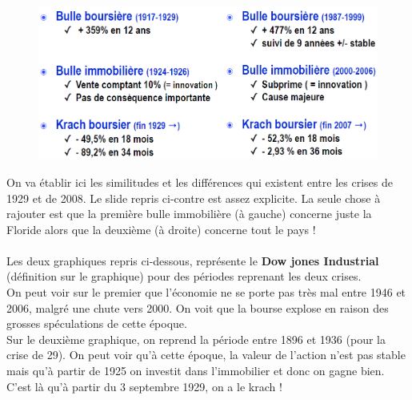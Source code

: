 \begin{figure}
	\includegraphics[scale=0.3]{43}
\end{figure}
\noindent On va établir ici les similitudes et les différences qui existent entre les crises de 1929 et de 2008. Le slide repris ci-contre est assez explicite. La seule chose à rajouter est que la première bulle immobilière (à gauche) concerne juste la Floride alors que la deuxième (à droite) concerne tout le pays ! 
\\\\
Les deux graphiques repris ci-dessous, représente le \textbf{Dow jones Industrial} (définition sur le graphique) pour des périodes reprenant les deux crises. \\
On peut voir sur le premier que l'économie ne se porte pas très mal entre 1946 et 2006, malgré une chute vers 2000. On voit que la bourse explose en raison des grosses spéculations de cette époque. \\
Sur le deuxième graphique, on reprend la période entre 1896 et 1936 (pour la crise de 29). On peut voir qu'à cette époque, la valeur de l'action n'est pas stable mais qu'à partir de 1925 on investit dans l'immobilier et donc on gagne bien. C'est là qu'à partir du 3 septembre 1929, on a le krach ! \\

